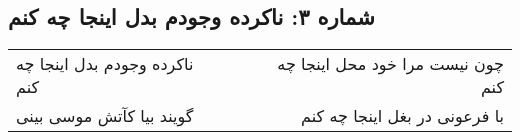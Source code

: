 \begin{center}
\section*{شماره ۳: ناکرده وجودم بدل اینجا چه کنم}
\label{sec:003}
\begin{longtable}{l p{0.5cm} r}
ناکرده وجودم بدل اینجا چه کنم
&&
چون نیست مرا خود محل اینجا چه کنم
\\
گویند بیا کآتش موسی بینی
&&
با فرعونی در بغل اینجا چه کنم
\\
\end{longtable}
\end{center}
